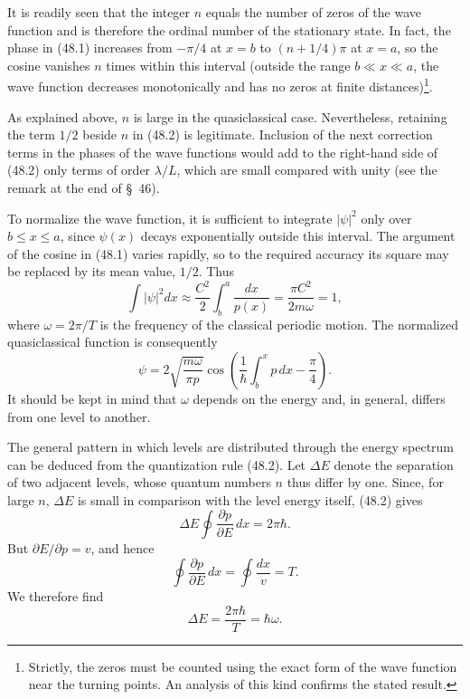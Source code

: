 It is readily seen that the integer $n$ equals the number of zeros of the wave
function and is therefore the ordinal number of the stationary state. In
fact, the phase in (48.1) increases from $-\pi/4$ at $x=b$ to
$(n+1/4)\pi$ at $x=a$, so the cosine vanishes $n$ times within this interval
(outside the range $b\ll x\ll a$, the wave function decreases monotonically
and has no zeros at finite distances)\footnote{Strictly, the zeros must be
counted using the exact form of the wave function near the turning points. An
analysis of this kind confirms the stated result.}.

As explained above, $n$ is large in the quasiclassical case. Nevertheless,
retaining the term $1/2$ beside $n$ in (48.2) is legitimate. Inclusion of the
next correction terms in the phases of the wave functions would add to the
right-hand side of (48.2) only terms of order $\lambda/L$, which are small
compared with unity (see the remark at the end of §~46).

To normalize the wave function, it is sufficient to integrate $|\psi|^2$
only over $b\leq x\leq a$, since $\psi(x)$ decays exponentially outside this
interval. The argument of the cosine in (48.1) varies rapidly, so to the
required accuracy its square may be replaced by its mean value, $1/2$. Thus
\[
  \int|\psi|^2dx\approx\frac{C^2}{2}\int_b^a\frac{dx}{p(x)}
  =\frac{\pi C^2}{2m\omega}=1,
\]
where $\omega=2\pi/T$ is the frequency of the classical periodic motion. The
normalized quasiclassical function is consequently
\begingroup\small
\begin{equation}
  \psi=2\sqrt{\frac{m\omega}{\pi p}}
  \cos\left(\frac1\hbar\int_b^x p\,dx-\frac\pi4\right).
  \tag{48.3}
\end{equation}
\endgroup
It should be kept in mind that $\omega$ depends on the energy and, in
general, differs from one level to another.



The general pattern in which levels are distributed through the energy
spectrum can be deduced from the quantization rule (48.2). Let $\Delta E$
denote the separation of two adjacent levels, whose quantum numbers $n$ thus
differ by one. Since, for large $n$, $\Delta E$ is small in comparison with
the level energy itself, (48.2) gives
\[
  \Delta E\oint\frac{\partial p}{\partial E}\,dx=2\pi\hbar.
\]
But $\partial E/\partial p=v$, and hence
\[
  \oint\frac{\partial p}{\partial E}\,dx=\oint\frac{dx}{v}=T.
\]
We therefore find
\begin{equation}
  \Delta E=\frac{2\pi\hbar}{T}=\hbar\omega.
  \tag{48.5}
\end{equation}

